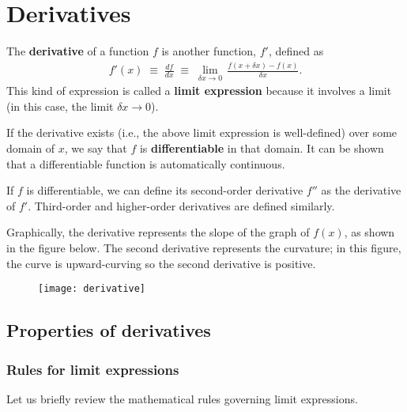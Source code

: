 \documentclass[10pt,a4paper]{article}
\begin{document}
\setcounter{page}{7}

\section{Derivatives}\label{derivatives}

The \textbf{derivative} of a function $f$ is another function, $f'$,
defined as
\begin{align}
  f'(x) \;\equiv\; \frac{df}{dx} \;\equiv\; \lim_{\delta x \rightarrow 0} \, \frac{f(x + \delta x) - f(x)}{\delta x}.
\end{align}
This kind of expression is called a \textbf{limit expression} because
it involves a limit (in this case, the limit $\delta x \rightarrow
0$).

If the derivative exists (i.e., the above limit expression is
well-defined) over some domain of $x$, we say that $f$ is
\textbf{differentiable} in that domain.  It can be shown that a
differentiable function is automatically continuous.

If $f$ is differentiable, we can define its second-order derivative
$f''$ as the derivative of $f'$. Third-order and higher-order
derivatives are defined similarly.

Graphically, the derivative represents the slope of the graph of
$f(x)$, as shown in the figure below.  The second derivative
represents the curvature; in this figure, the curve is upward-curving
so the second derivative is positive.

\begin{figure}[h]
  \centering\texttt{[image: derivative]}
\end{figure}

\subsection{Properties of derivatives}
\label{properties-of-derivatives}

\subsubsection{Rules for limit expressions}
\label{rules-for-limit-expressions}

Let us briefly review the mathematical rules governing limit expressions.
\end{document}
